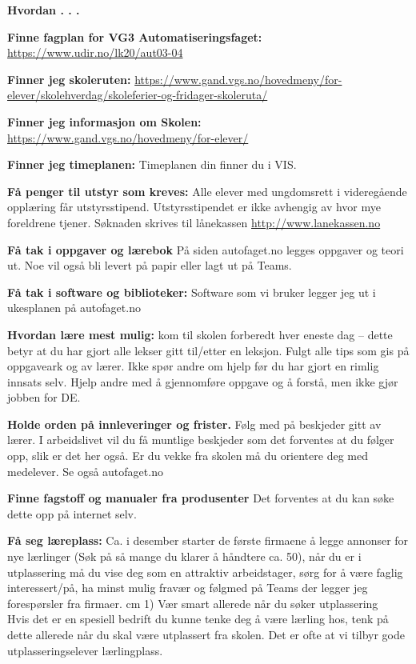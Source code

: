 

\centerline{\bf Hvordan . . .} \bigskip 

\noindent
{\bf Finne fagplan for VG3 Automatiseringsfaget:} \url{https://www.udir.no/lk20/aut03-04}
\vskip 10pt

\noindent
{\bf Finner jeg skoleruten:} \url{https://www.gand.vgs.no/hovedmeny/for-elever/skolehverdag/skoleferier-og-fridager-skoleruta/}
\vskip 10pt

\noindent
{\bf Finner jeg informasjon om Skolen:} \url{https://www.gand.vgs.no/hovedmeny/for-elever/}
\vskip 10pt

\noindent
{\bf Finner jeg timeplanen:} Timeplanen din finner du i VIS. 
\vskip 10pt

\noindent
{\bf Få penger til utstyr som kreves:} Alle elever med ungdomsrett i videregående opplæring får utstyrsstipend. Utstyrsstipendet er ikke avhengig av hvor mye foreldrene tjener.
Søknaden skrives til lånekassen \url{http://www.lanekassen.no}
\vskip 10pt

\noindent
{\bf Få tak i oppgaver og lærebok} På siden autofaget.no legges oppgaver og teori ut. Noe vil også bli levert på papir eller lagt ut på Teams. 
\vskip 10pt

\noindent
{\bf Få tak i  software og biblioteker:} Software som vi bruker legger jeg ut i ukesplanen på autofaget.no  
\vskip 10pt

\noindent
{\bf Hvordan lære mest mulig:} kom til skolen forberedt hver eneste dag -- dette betyr at du har gjort alle lekser gitt til/etter en leksjon. Fulgt alle tips som gis på oppgaveark og av lærer. Ikke spør andre om hjelp før du har gjort en rimlig innsats selv. Hjelp andre med å gjennomføre oppgave og å forstå, men ikke gjør jobben for DE. 
\vskip 10pt

\noindent
{\bf Holde orden på innleveringer og frister.} Følg med på beskjeder gitt av lærer. I arbeidslivet vil du få muntlige beskjeder som det forventes at du følger opp, slik er det her også. Er du vekke fra skolen må du orientere deg med medelever. Se også autofaget.no
\vskip 10pt


\noindent
{\bf Finne fagstoff og manualer fra produsenter } Det forventes at du kan søke dette opp på internet selv. 
\vskip 10pt



\noindent
{\bf Få seg læreplass:} Ca. i desember starter de første firmaene å legge annonser for nye lærlinger (Søk på så mange du klarer å håndtere ca. 50), når du er i utplassering må du vise deg som en attraktiv arbeidstager, sørg for å være faglig interessert/på, ha minst mulig fravær og følgmed på Teams der legger jeg forespørsler fra firmaer. 
 cm
1) Vær smart allerede når du søker utplassering\\
Hvis det er en spesiell bedrift du kunne tenke deg å være lærling hos, tenk på dette allerede når du skal være utplassert fra skolen. Det er ofte at vi tilbyr gode utplasseringselever lærlingplass.

